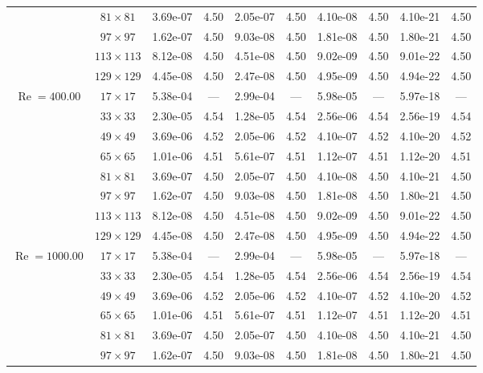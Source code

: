 \documentclass[preprint, 12pt]{elsarticle}
\begin{document}
{\begin{center}
\begin{table}[H]
{\begin{tabular*}{\textwidth}{@{\extracolsep\fill}cccccccccc@{}}
    & $81\times 81$ & 3.69e-07 & 4.50 & 2.05e-07 & 4.50 & 4.10e-08 & 4.50 & 4.10e-21 & 4.50 \\
    & $97\times 97$ & 1.62e-07 & 4.50 & 9.03e-08 & 4.50 & 1.81e-08 & 4.50 & 1.80e-21 & 4.50 \\
    & $113\times 113$ & 8.12e-08 & 4.50 & 4.51e-08 & 4.50 & 9.02e-09 & 4.50 & 9.01e-22 & 4.50 \\
    & $129\times 129$ & 4.45e-08 & 4.50 & 2.47e-08 & 4.50 & 4.95e-09 & 4.50 & 4.94e-22 & 4.50 \\
    \hline
    \multirow{7}{*}{$\operatorname{Re}=400.00$} & $17\times 17$ & 5.38e-04 & --- & 2.99e-04 & --- & 5.98e-05 & --- & 5.97e-18 & --- \\
    & $33\times 33$ & 2.30e-05 & 4.54 & 1.28e-05 & 4.54 & 2.56e-06 & 4.54 & 2.56e-19 & 4.54 \\
    & $49\times 49$ & 3.69e-06 & 4.52 & 2.05e-06 & 4.52 & 4.10e-07 & 4.52 & 4.10e-20 & 4.52 \\
    \multirow{3}{*}{$\operatorname{Wi}=5$} & $65\times 65$ & 1.01e-06 & 4.51 & 5.61e-07 & 4.51 & 1.12e-07 & 4.51 & 1.12e-20 & 4.51 \\
    & $81\times 81$ & 3.69e-07 & 4.50 & 2.05e-07 & 4.50 & 4.10e-08 & 4.50 & 4.10e-21 & 4.50 \\
    & $97\times 97$ & 1.62e-07 & 4.50 & 9.03e-08 & 4.50 & 1.81e-08 & 4.50 & 1.80e-21 & 4.50 \\
    & $113\times 113$ & 8.12e-08 & 4.50 & 4.51e-08 & 4.50 & 9.02e-09 & 4.50 & 9.01e-22 & 4.50 \\
    & $129\times 129$ & 4.45e-08 & 4.50 & 2.47e-08 & 4.50 & 4.95e-09 & 4.50 & 4.94e-22 & 4.50 \\
    \hline
    \multirow{7}{*}{$\operatorname{Re}=1000.00$} & $17\times 17$ & 5.38e-04 & --- & 2.99e-04 & --- & 5.98e-05 & --- & 5.97e-18 & --- \\
    & $33\times 33$ & 2.30e-05 & 4.54 & 1.28e-05 & 4.54 & 2.56e-06 & 4.54 & 2.56e-19 & 4.54 \\
    & $49\times 49$ & 3.69e-06 & 4.52 & 2.05e-06 & 4.52 & 4.10e-07 & 4.52 & 4.10e-20 & 4.52 \\
    \multirow{3}{*}{$\operatorname{Wi}=5$} & $65\times 65$ & 1.01e-06 & 4.51 & 5.61e-07 & 4.51 & 1.12e-07 & 4.51 & 1.12e-20 & 4.51 \\
    & $81\times 81$ & 3.69e-07 & 4.50 & 2.05e-07 & 4.50 & 4.10e-08 & 4.50 & 4.10e-21 & 4.50 \\
    & $97\times 97$ & 1.62e-07 & 4.50 & 9.03e-08 & 4.50 & 1.81e-08 & 4.50 & 1.80e-21 & 4.50 \\

\end{tabular*}}
\end{table}
\end{center}}
\end{document}
